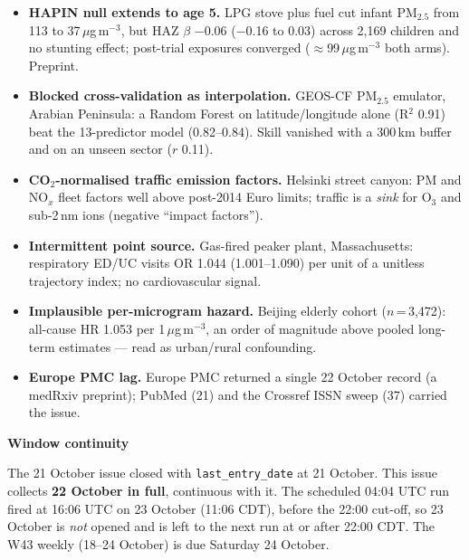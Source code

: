 \documentclass[10pt]{article}
\begin{document}
\footnotesize
\begin{itemize}

\item \textbf{HAPIN null extends to age 5.} LPG stove plus fuel cut infant PM$_{2.5}$ from 113 to 37\,$\mu$g\,m$^{-3}$,
but HAZ $\beta$ $-$0.06 ($-$0.16 to 0.03) across 2,169 children and no stunting effect; post-trial exposures
converged ($\approx$99\,$\mu$g\,m$^{-3}$ both arms). Preprint.

\item \textbf{Blocked cross-validation as interpolation.} GEOS-CF PM$_{2.5}$ emulator, Arabian Peninsula: a Random
Forest on latitude/longitude alone (R$^2$ 0.91) beat the 13-predictor model (0.82--0.84). Skill vanished with a
300\,km buffer and on an unseen sector ($r$ 0.11).

\item \textbf{CO$_2$-normalised traffic emission factors.} Helsinki street canyon: PM and NO$_x$ fleet factors well
above post-2014 Euro limits; traffic is a \emph{sink} for O$_3$ and sub-2\,nm ions (negative ``impact factors'').

\item \textbf{Intermittent point source.} Gas-fired peaker plant, Massachusetts: respiratory ED/UC visits OR 1.044
(1.001--1.090) per unit of a unitless trajectory index; no cardiovascular signal.

\item \textbf{Implausible per-microgram hazard.} Beijing elderly cohort ($n$\,=\,3,472): all-cause HR 1.053 per
1\,$\mu$g\,m$^{-3}$, an order of magnitude above pooled long-term estimates --- read as urban/rural confounding.

\item \textbf{Europe PMC lag.} Europe PMC returned a single 22 October record (a medRxiv preprint); PubMed (21) and the
Crossref ISSN sweep (37) carried the issue.

\end{itemize}

\vspace{2mm}

\begin{keybox}
{\sffamily\bfseries\footnotesize\color{Deep}Window continuity}\\[1.2mm]
{\fontsize{7.2}{8.8}\selectfont
The 21 October issue closed with \texttt{last\_entry\_date} at 21 October. This issue collects
\textbf{22 October in full}, continuous with it. The scheduled 04:04 UTC run fired at 16:06 UTC on 23 October
(11:06 CDT), before the 22:00 cut-off, so 23 October is \emph{not} opened and is left to the next run at or after
22:00 CDT. The W43 weekly (18--24 October) is due Saturday 24 October.\par}
\end{keybox}
\end{document}

